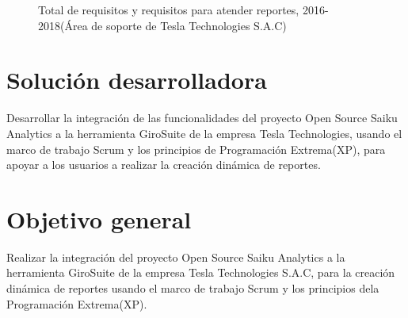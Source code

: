 \begin{spacing}{1.5}
	\begin{figure}[H]
		\begin{center}
			\tikzI
		\end{center}
		\caption {\centering \small{Total de requisitos y requisitos para atender reportes,  2016-2018(\'{A}rea de soporte de Tesla Technologies S.A.C)}} \label{figure:chaperI_1}
	\end{figure}
	
\end{spacing}

\clearpage
\section{Soluci\'{o}n desarrolladora}
\begin{spacing}{1.5}
	Desarrollar la integraci\'{o}n de las funcionalidades del proyecto Open Source Saiku Analytics a la herramienta GiroSuite de la empresa Tesla Technologies, usando el marco de trabajo Scrum y los principios de Programaci\'{o}n Extrema(XP), para apoyar a los usuarios a realizar la creaci\'{o}n din\'{a}mica de reportes.
\end{spacing}
\section{Objetivo general}
\begin{spacing}{1.5}
	Realizar la integraci\'{o}n del proyecto Open Source Saiku Analytics a la herramienta GiroSuite de la empresa Tesla Technologies S.A.C, para la creaci\'{o}n din\'{a}mica de reportes  usando el marco de trabajo Scrum y los principios dela Programaci\'{o}n Extrema(XP).
\end{spacing}
